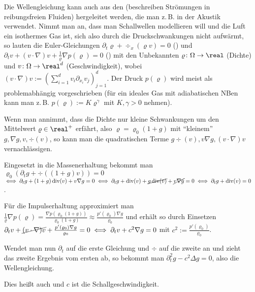 \begin{Bem}
    Die Wellengleichung kann auch aus den 
    (beschreiben Strömungen in reibungsfreien Fluiden) hergeleitet werden,
    die man z.\,B. in der Akustik verwendet.
    Nimmt man an, dass man Schallwellen modellieren will und die Luft ein isothermes Gas ist,
    sich also durch die Druckschwankungen nicht aufwärmt, so lauten die Euler-Gleichungen
    $\partial_t \varrho + \div_x(\varrho v) = 0$ () und
    $\partial_t v + (v \cdot \nabla) v + \frac{1}{\varrho} \nabla p(\varrho) = 0$
    ()
    mit den Unbekannten $\varrho\colon \Omega \to \real$ (Dichte) und
    $v\colon \Omega \to \real^d$ (Geschwindigkeit),
    wobei\\
    $(v \cdot \nabla) v := (\sum_{i=1}^d v_i \partial_{x_i} v_j)_{j=1}^d$.
    Der Druck $p(\varrho)$ wird meist als  problemabhängig
    vorgeschrieben (für ein ideales Gas mit adiabatischen NBen kann man z.\,B.
    $p(\varrho) := K \varrho^\gamma$ mit $K, \gamma > 0$ nehmen).
    
    Wenn man annimmt, dass die Dichte nur kleine Schwankungen um den Mittelwert
    $\varrho \in \real^+$ erfährt, also $\varrho = \varrho_0 (1 + g)$ mit "`kleinem"'
    $g, \nabla g, v, \div(v)$, so kann man die quadratischen Terme
    $g\div(v), v \nabla g, (v \cdot \nabla) v$ vernachlässigen.
    
    Eingesetzt in die Massenerhaltung bekommt man
    $\varrho_0 (\partial_t g + \div((1 + g) v)) = 0$\\
    $\iff \partial_t g + (1 + g) \div(v) + v \nabla g = 0
    \iff \partial_t g + \div(v) + \cancel{g \div(v)} + \cancel{v \nabla g} = 0
    \iff \partial_t g + \div(v) = 0$.
    
    Für die Impulserhaltung approximiert man
    $\frac{1}{\varrho} \nabla p(\varrho)
    = \frac{\nabla p(\varrho_0 (1 + g))}{\varrho_0 (1 + g)}
    \approx \frac{p'(\varrho_0) \nabla g}{\varrho_0}$
    und erhält so durch Einsetzen
    $\partial_t v + \cancel{(v \cdot \nabla) v} + \frac{p'(\varrho_0) \nabla g}{\varrho_0}
    = 0 \iff \partial_t v + c^2 \nabla g = 0$ mit $c^2 := \frac{p'(\varrho_0)}{\varrho_0}$.
    
    Wendet man nun $\partial_t$ auf die erste Gleichung und $\div$ auf die zweite an
    und zieht das zweite Ergebnis vom ersten ab, so bekommt man
    $\partial_t^2 g - c^2 \Delta g = 0$,
    also die Wellengleichung.
    
    Dies heißt auch 
    und $c$ ist die Schallgeschwindigkeit.
\end{Bem}

